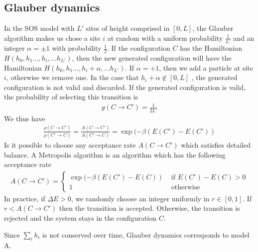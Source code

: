 \subsection{Glauber dynamics}

In the SOS model with $L'$ sites of height comprised in $[0,L]$, the Glauber algorithm \cite{glauber_timedependent_1963} makes us chose a site $i$ at random with a uniform probability $\frac{1}{L'}$ and an integer $\alpha = \pm 1$ with probability $\frac{1}{2}$. If the configuration $C$ has the Hamiltonian $H(h_0,h_1...,h_i,...h_{L'})$, then the new generated configuration will have the Hamiltonian $H(h_0,h_1...,h_i+\alpha,...h_{L'})$.
If $\alpha=+1$, then we add a particle at site $i$, otherwise we remove one. In the case that $h_i+\alpha \not\in [0,L]$ , the generated configuration is not valid and discarded.
If the generated configuration is valid, the probability of selecting this transition is
\begin{align}
g(C\to C') = \frac{1}{2L'}
\end{align}
We thus have
\begin{align}
\frac{\rho(C\to C')}{\rho(C' \to C)} = \frac{A(C\to C')}{A(C'\to C)} = \exp(-\beta (E(C')-E(C'))
\end{align}
Is it possible to choose any acceptance rate $A(C\to C')$ which satisfies detailed balance. A Metropolis algorithm is an algorithm which has the following acceptance rate
\begin{align}
A(C\to C') = \begin{cases} \exp(-\beta (E(C')-E(C)) &\text{ if } E(C')-E(C) \greater 0 \\
1 &\text{ otherwise} \end{cases}
\label{taux-transition-metropolis}
\end{align}
In practice, if $\Delta E \greater 0$, we randomly choose an integer uniformly in $r\in[0,1]$. If $r\less A(C\to C') $ then the transition is accepted. Otherwise, the transition is rejected and the system stays in the configuration $C$.

Since $\sum_i h_i$ is not conserved over time, Glauber dynamics corresponds to model A.

